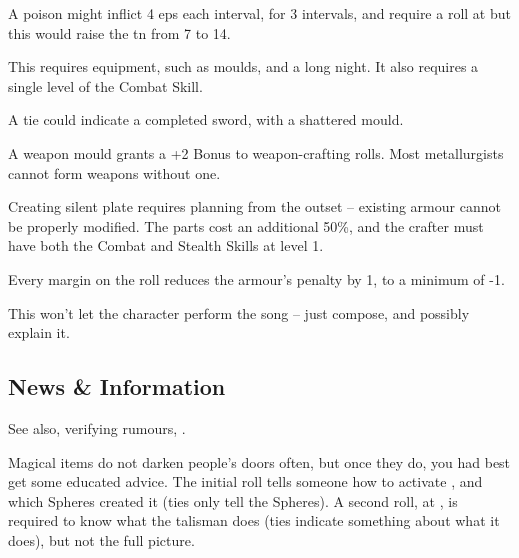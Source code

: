 \begin{multicols}{2}
A poison might inflict 4 \glspl{ep} each \gls{interval}, for 3 \glspl{interval}, and require a  roll at \tn[10] but this would raise the \gls{tn} from 7 to 14.


This requires equipment, such as moulds, and a long night.
It also requires a single level of the Combat Skill.

A tie could indicate a completed sword, with a shattered mould.

A weapon mould grants a +2 Bonus to weapon-crafting rolls.
Most metallurgists cannot form weapons without one.

Creating silent plate requires planning from the outset -- existing armour cannot be properly modified.
The parts cost an additional 50\%, and the crafter must have both the Combat and Stealth Skills at level 1.

Every margin on the roll reduces the armour's penalty by 1, to a minimum of -1.

This won't let the character perform the song -- just compose, and possibly explain it.


\subsection{News \& Information}

See also, verifying rumours, .

Magical items do not darken people's doors often, but once they do, you had best get some educated advice.
The initial roll tells someone how to activate , and which Spheres created it (ties only tell the Spheres).
A second roll, at \tn[14], is required to know what the \gls{talisman} does (ties indicate something about what it does), but not the full picture.



\end{multicols}
